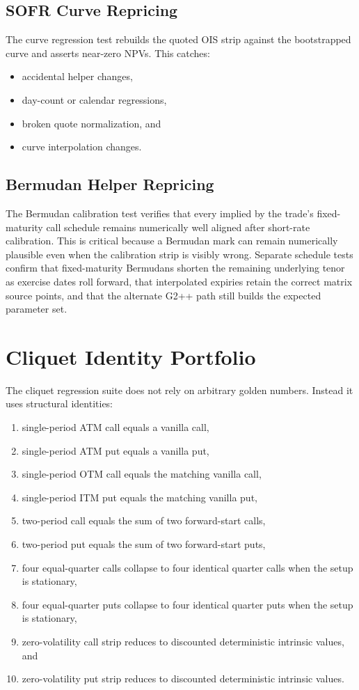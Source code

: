 \documentclass[conference]{IEEEtran}
\begin{document}
\subsection{SOFR Curve Repricing}
The curve regression test rebuilds the quoted OIS strip against the bootstrapped curve and asserts near-zero NPVs. This catches:
\begin{itemize}[leftmargin=1.5em]
    \item accidental helper changes,
    \item day-count or calendar regressions,
    \item broken quote normalization, and
    \item curve interpolation changes.
\end{itemize}

\subsection{Bermudan Helper Repricing}
The Bermudan calibration test verifies that every  implied by the trade's fixed-maturity call schedule remains numerically well aligned after short-rate calibration. This is critical because a Bermudan mark can remain numerically plausible even when the calibration strip is visibly wrong. Separate schedule tests confirm that fixed-maturity Bermudans shorten the remaining underlying tenor as exercise dates roll forward, that interpolated expiries retain the correct matrix source points, and that the alternate G2++ path still builds the expected parameter set.

\section{Cliquet Identity Portfolio}
The cliquet regression suite does not rely on arbitrary golden numbers. Instead it uses structural identities:
\begin{enumerate}[leftmargin=1.5em]
    \item single-period ATM call equals a vanilla call,
    \item single-period ATM put equals a vanilla put,
    \item single-period OTM call equals the matching vanilla call,
    \item single-period ITM put equals the matching vanilla put,
    \item two-period call equals the sum of two forward-start calls,
    \item two-period put equals the sum of two forward-start puts,
    \item four equal-quarter calls collapse to four identical quarter calls when the setup is stationary,
    \item four equal-quarter puts collapse to four identical quarter puts when the setup is stationary,
    \item zero-volatility call strip reduces to discounted deterministic intrinsic values, and
    \item zero-volatility put strip reduces to discounted deterministic intrinsic values.
\end{enumerate}
\end{document}
